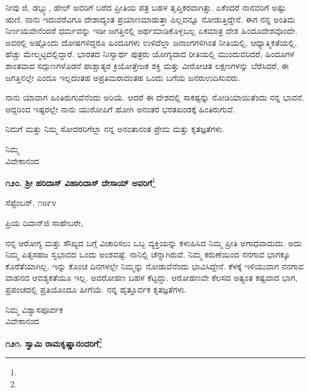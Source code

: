 ನೀವು ಜಿ, ಡಬ್ಲ್ಯು, ಹೇಲ್‌ ಅವರಿಗೆ ಬರೆದ ಪ್ರೀತಿಯ ಪತ್ರ ಬಹಳ ತೃಪ್ತಿಕರವಾಗಿತ್ತು. ಏಕೆಂದರೆ ನಾನವರಿಗೆ ಅಷ್ಟು ಋಣಿ. ನಾನು ಇದುವರೆವಿಗೂ ದೇಶಾದ್ಯಂತ ಪ್ರಯಾಣಮಾಡುತ್ತಾ ಎಲ್ಲವನ್ನೂ ನೋಡುತ್ತಿದ್ದೇನೆ. ಈಗ ನನ್ನ ಅಂತಿಮ ನಿರ್ಣಯವೇನೆಂದರೆ ಧರ್ಮವನ್ನು ಇಡೀ ಜಗತ್ತಿನಲ್ಲಿ ಅರ್ಥಮಾಡಿಕೊಳ್ಳಬಲ್ಲ ಏಕಮಾತ್ರ ದೇಶ ಹಿಂದೂದೇಶವೊಂದೇ. ಅವರಲ್ಲಿ ಅಷ್ಟೊಂದು ದೋಷಗಳಿದ್ದರೂ ಹಿಂದೂಗಳು ಉಳಿದೆಲ್ಲಾ ಜನಾಂಗಗಳಿಗಿಂತ ನೀತಿಯಲ್ಲಿ, ಆಧ್ಯಾತ್ಮಿಕತೆಯಲ್ಲಿ, ಹೆಚ್ಚು ಮೇಲ್ಮಟ್ಟದಲ್ಲಿದ್ದಾರೆ. ಭಾರತದ ನಿಃಸ್ವಾರ್ಥ ಪುತ್ರರು ಯೋಗ್ಯವಾದ ರೀತಿಯಲ್ಲಿ ಮುಂದುವರಿದರೆ, ಹಿಂದೂಗಳ ಶಾಂತವಾದ ಸದ್ಗುಣಗಳೊಡನೆ ಪಾಶ್ಚಾತ್ಯರ ಕ್ರಿಯೋತ್ತೇಜಕ ಶಕ್ತಿ ಮತ್ತು ವೀರೋಚಿತ ಲಕ್ಷಣಗಳನ್ನು ಬೆರೆಸಿದರೆ, ಈ ಜಗತ್ತಿನಲ್ಲೇ ಎಂದೂ ಇಲ್ಲದಂತಹ ಅಪ್ರತಿಮರಾದಂತಹ ಒಂದು ಬಗೆಯ ಜನರು\break ಉದಿಸುವರು.

ನಾನು ಯಾವಾಗ ಹಿಂತಿರುಗುವೆನೆಂದು ಅರಿಯೆ. ಆದರೆ ಈ ದೇಶದಲ್ಲಿ ಸಾಕಷ್ಟನ್ನು ನೋಡಿಯಾಯಿತೆಂದು ನನ್ನ ಭಾವನೆ. ಆದ್ದರಿಂದ ಇಷ್ಟರಲ್ಲೇ ನಾನು ಯುರೋಪಿಗೆ ಹೋಗಿ ಅನಂತರ ಭರತಖಂಡಕ್ಕೆ ಹಿಂತಿರುಗುವೆ.

ನಿಮಗೆ ಮತ್ತು ನಿಮ್ಮ ಸೋದರರಿಗೆಲ್ಲಾ ನನ್ನ ಅನಂತಾನಂತ ಪ್ರೇಮ ಮತ್ತು ಕೃತಜ್ಞತೆಗಳು.

\vspace{-0.5cm}

{\flushright
ನಿಮ್ಮ\\ವಿವೇಕಾನಂದ\par}

\begin{center}
\textbf{೧೨೦. ಶ‍್ರೀ ಹರಿದಾಸ್ ವಿಹಾರಿದಾಸ್ ದೇಸಾಯ್ ಅವರಿಗೆ}\footnote{}
\end{center}

\begin{flushright}
ಸೆಪ್ಟೆಂಬರ್, ೧೮೯೪
\end{flushright}

\noindent
ಪ್ರಿಯ ದಿವಾನ್‌ಜಿ ಸಾಹೇಬರೇ,

ನನ್ನ ಆರೋಗ್ಯ ಮತ್ತು ಸೌಖ್ಯದ ಬಗ್ಗೆ ವಿಚಾರಿಸಲು ಒಬ್ಬ ವ್ಯಕ್ತಿಯನ್ನು ಕಳುಹಿಸಿದ ನಿಮ್ಮ ಪ್ರೀತಿ ಅಗಾಧವಾದುದು. ಅದು ನಿಮ್ಮ ಪಿತೃಸಹಜ ಸ್ವಭಾವದ ಒಂದು ಅಂಶವಷ್ಟೆ. ನಾನಿಲ್ಲಿ ಚೆನ್ನಾಗಿರುವೆ. ನಿಮ್ಮ ಕರುಣೆಯಿಂದ ನನಗಾವ ಭಾಗಕ್ಕೂ ಕೊರೆತೆಯಾಗಿಲ್ಲ. ಇನ್ನು ಕೊಂಚ ದಿನಗಳಲ್ಲೇ ನಿಮ್ಮನ್ನು ನೋಡುವೆನೆಂದು ಭಾವಿಸಿದ್ದೇನೆ. ಕೆಳಕ್ಕೆ ಇಳಿಯುವಾಗ ನನಗಾವ ವಾಹನದ ಆವಶ್ಯಕತೆಯೂ ಇಲ್ಲ. ಅವರೋಹಣ ಬಹಳ ಕೆಟ್ಟದ್ದು. ಆರೋಹಣವೇ ಕೆಲಸದ ಅತ್ಯಂತ ಕಷ್ಟವಾದ ಭಾಗ, ಪ್ರಪಂಚದಲ್ಲಿ ಪ್ರತಿಯೊಂದೂ ಹೀಗೆಯೆ. ನನ್ನ ಹೃತ್ತೂರ್ವಕ ಕೃತಜ್ಞತೆಗಳು.

\vspace{-0.5cm}

{\flushright
ನಿಮ್ಮ ವಿಶ್ವಾಸಪೂರ್ವಕ\\ವಿವೇಕಾನಂದ\par}

\begin{center}
\textbf{೧೨೧. ಸ್ವಾಮಿ ರಾಮಕೃಷ್ಣಾನಂದರಿಗೆ}\footnote{}
\end{center}

